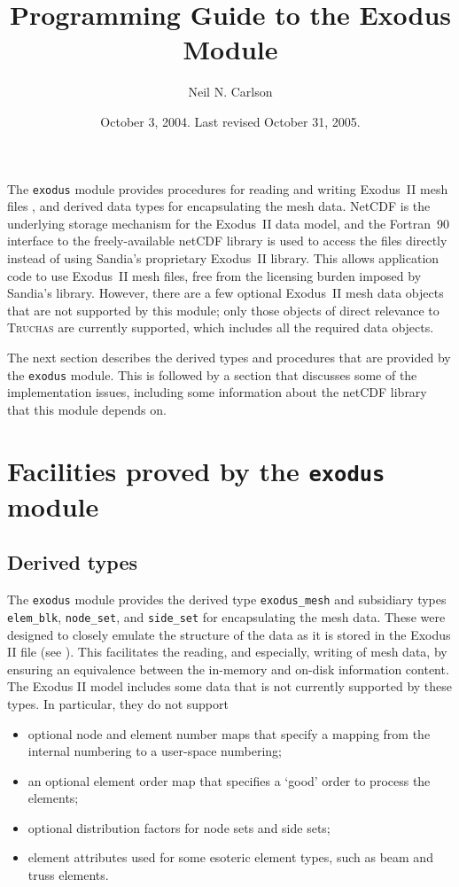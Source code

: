 \documentclass[oneside,12pt]{amsart}
\begin{document}
\title{Programming Guide to the Exodus Module}
\author{Neil N. Carlson}
\address{Los Alamos National Laboratory}
\date{October 3, 2004. Last revised October 31, 2005.}
\maketitle

The \texttt{exodus} module provides procedures for reading and writing
Exodus~II mesh files \cite{exodusII}, and derived data types for encapsulating the
mesh data.  NetCDF \cite{netcdf-3.5} is the underlying storage mechanism for the
Exodus~II data model, and the Fortran~90 interface to the freely-available
netCDF library is used to access the files directly instead of using Sandia's
proprietary Exodus~II library.  This allows application code to use Exodus~II
mesh files, free from the licensing burden imposed by Sandia's library.
However, there are a few optional Exodus~II mesh data objects that are not
supported by this module; only those objects of direct relevance to
\textsc{Truchas} are currently supported, which includes all the required
data objects.

The next section describes the derived types and procedures that are
provided by the \texttt{exodus} module.  This is followed by a section
that discusses some of the implementation issues, including some information
about the netCDF library that this module depends on.

\section{Facilities proved by the \texttt{exodus} module}

\subsection{Derived types}\label{DDT}
The \texttt{exodus} module provides the derived type \texttt{exodus_mesh} and
subsidiary types \texttt{elem_blk}, \texttt{node_set}, and \texttt{side_set}
for encapsulating the mesh data.  These were designed to closely emulate the
structure of the data as it is stored in the Exodus II file (see 
\cite[Appendix~A]{exodusII}).  This facilitates the reading, and especially, writing of
mesh data, by ensuring an equivalence between the in-memory and on-disk
information content.  The Exodus II model includes some data that is not
currently supported by these types.  In particular, they do not support
\begin{itemize}
\item optional node and element number maps that specify a mapping from
  the internal numbering to a user-space numbering;
\item an optional element order map that specifies a `good' order to process
  the elements;
\item optional distribution factors for node sets and side sets;
\item element attributes used for some esoteric element types, such as beam
  and truss elements.
\end{itemize}
\end{document}
